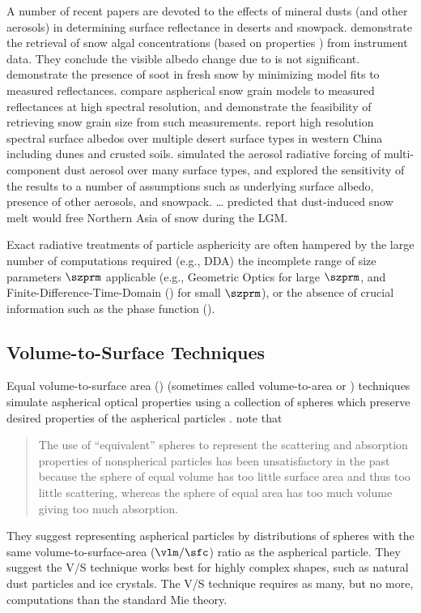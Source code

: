 \documentclass[12pt,twoside]{book}
\begin{document}
A number of recent papers are devoted to the effects of mineral
dusts (and other aerosols) in determining surface reflectance in
deserts and snowpack.
\cite{PDT01} demonstrate the retrieval of snow algal concentrations
(based on properties ) from
 instrument data.
They conclude the visible albedo change due to  is
not significant.
\cite{MAH05} demonstrate the presence of soot in fresh snow by
minimizing model fits to measured reflectances.
\cite{KAH05} compare aspherical snow grain models to measured
reflectances at high spectral resolution, and demonstrate the
feasibility of retrieving snow grain size from such measurements. 
\cite{AMY05} report high resolution spectral surface albedos over
multiple desert surface types in western China including dunes and
crusted soils.
\cite{ATU05} simulated the aerosol radiative forcing of
multi-component dust aerosol over many surface types, and explored the
sensitivity of the results to a number of assumptions such as
underlying surface albedo, presence of other aerosols, and snowpack.
\cite{AHK06} \ldots %
\cite{KBB06} predicted that dust-induced snow melt would free Northern
Asia of snow during the LGM.

Exact radiative treatments of particle asphericity are often hampered 
by the large number of computations required (e.g., DDA) the
incomplete range of size parameters $\szprm$ applicable (e.g.,
Geometric Optics for large $\szprm$, and Finite-Difference-Time-Domain 
() for small $\szprm$), or the absence of crucial 
information such as the phase function ().

\subsection[Volume-to-Surface Techniques]{Volume-to-Surface Techniques}\label{sxn:vts}
Equal volume-to-surface area () (sometimes called
volume-to-area or ) techniques simulate aspherical optical
properties using a collection of spheres which preserve desired
properties of the aspherical particles \cite[]{GrW99,NGW03}.
\cite{GrW99} note that 
\begin{quote}
The use of ``equivalent'' spheres to represent
the scattering and absorption properties of nonspherical particles has
been unsatisfactory in the past because the sphere of equal volume has
too little surface area and thus too little scattering, whereas the
sphere of equal area has too much volume giving too much absorption.
\end{quote}
They suggest representing aspherical particles by distributions of
spheres with the same volume-to-surface-area ($\vlm/\sfc$) ratio as
the aspherical particle.
They suggest the V/S technique works best for highly complex shapes,
such as natural dust particles and ice crystals.
The V/S technique requires as many, but no more, computations than
the standard Mie theory. 
\end{document}
